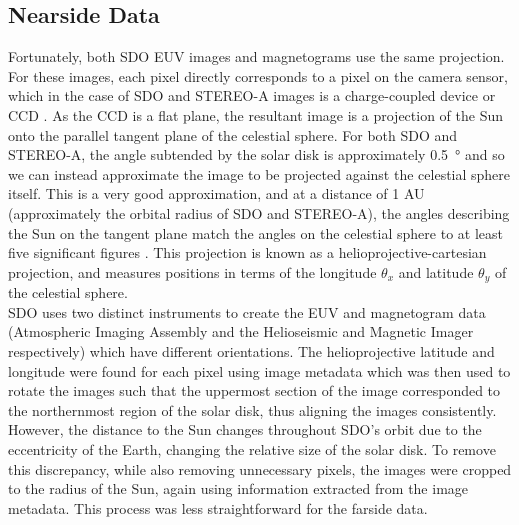\documentclass[11pt,a4paper,onecolumn]{report}
\begin{document}
\subsection{Nearside Data}
Fortunately,  both SDO EUV images and magnetograms use the same projection. For
these images, each pixel directly corresponds to a pixel on the camera sensor,
which in the case of SDO and STEREO-A images is a charge-coupled device or
CCD \citep{kaiser_stereo_2008,lemen_atmospheric_2012}. As the CCD is a flat plane,
the resultant image is a projection of the Sun onto the parallel tangent plane of the
celestial sphere.
For both SDO and STEREO-A, the angle subtended by the solar disk is
approximately \SI[]{0.5}[]{\degree} and so we can instead approximate the image
to be projected against the celestial sphere itself. This is a very good
approximation, and at a distance of 1 AU (approximately the orbital radius of
SDO and STEREO-A), the angles describing the Sun on the tangent plane match the
angles on the celestial sphere to at least five significant figures
\citep{thompson_w_t_coordinate_2006}. This projection is known as a
helioprojective-cartesian projection, and measures positions in terms of the
longitude \(\theta_x\) and latitude \(\theta_y\) of the celestial sphere.\\

SDO uses two distinct instruments to create the EUV and magnetogram data
(Atmospheric Imaging Assembly \citep{lemen_atmospheric_2012} and the
Helioseismic and Magnetic Imager \citep{scherrer_helioseismic_2012}
respectively) which have different orientations. The helioprojective latitude
and longitude were found for each pixel using image metadata which was then used
to rotate the images such that the uppermost section of the image corresponded
to the northernmost region of the solar disk, thus aligning the images
consistently.\\

However, the distance to the Sun changes throughout SDO's orbit due to the
eccentricity of the Earth, changing the relative size of the solar disk. To remove
this discrepancy, while also removing unnecessary pixels, the images were
cropped to the radius of the Sun, again using information extracted from the
image metadata. This process was less straightforward for the farside data.
\end{document}
